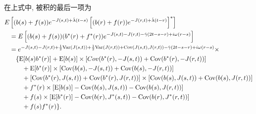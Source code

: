 \documentclass[notitlepage,cs4size,punct,oneside]{ctexrep}
\numberwithin{equation}{section}
\theoremstyle{mystyle}
\begin{document}
在上式中, 被积的最后一项为
\[
\begin{split}
E&\left[(b(s)+f(s))e^{-J(s, t)+\hat{\lambda}(t-s)}\left[(b(r)+f(r))e^{-J(r, t)+\hat{\lambda}(t-r)}\right]^*\right] \\
&= E\left[(b(s)+f(s))(b^*(r)+f^*(r))e^{-J(s, t)-J(r, t)-\hat{\gamma}(2t-s-r)+i\omega(r-s)}\right] \\
&= e^{-J(s, t)-J(r, t)+\frac{1}{2}\text{Var}(J(s, t))+\frac{1}{2}\text{Var}(J(r, t))+\text{Cov}(J(s, t), J(r, t))-\hat{\gamma}(2t-s-r)+i\omega(r-s)} \times \\
&\quad \{\text{E}[b(s)b^*(r)]+\text{E}[b(s)]\times[Cov(b^*(r), -J(s, t))+\text{Cov}(b^*(r), -J(r, t))] \\
&\quad\quad+ \text{E}[b^*(r)]\times[\text{Cov}(b(s), -J(s, t))+\text{Cov}(b(s), -J(r, t))]\\
&\quad\quad+ [\text{Cov}(b^*(r), J(s, t))+\text{Cov}(b^*(r), J(r, t))]\times [\text{Cov}(b(s), J(s, t))+\text{Cov}(b(s), J(r, t))] \\
&\quad\quad+ f^*(r)\times[\text{E}[b(s)]-\text{Cov}(b(s), J(s, t))-\text{Cov}(b(s), J(r, t))] \\
&\quad\quad+ f(s)\times[\text{E}[b^*(r)]-\text{Cov}(b(r), J^*(s, t))-\text{Cov}(b(r), J^*(r, t))] \\
&\quad\quad+f(s)f^*(r)\}. \\
\end{split}
\]
\end{document}
